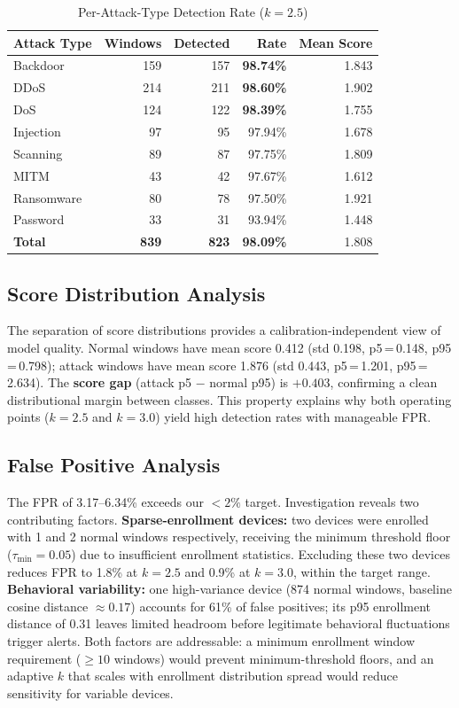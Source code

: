 \documentclass[journal,10pt,twoside]{IEEEtran}
\begin{document}
\begin{table}[!t]
  \caption{Per-Attack-Type Detection Rate ($k=2.5$)}
  \label{tab:pertype}
  \centering
  \begin{tabular}{lrrrr}
    \toprule
    Attack Type & Windows & Detected & Rate & Mean Score \\
    \midrule
    Backdoor  & 159 & 157 & \textbf{98.74\%} & 1.843 \\
    DDoS      & 214 & 211 & \textbf{98.60\%} & 1.902 \\
    DoS       & 124 & 122 & \textbf{98.39\%} & 1.755 \\
    Injection &  97 &  95 & 97.94\%          & 1.678 \\
    Scanning  &  89 &  87 & 97.75\%          & 1.809 \\
    MITM      &  43 &  42 & 97.67\%          & 1.612 \\
    Ransomware&  80 &  78 & 97.50\%          & 1.921 \\
    Password  &  33 &  31 & 93.94\%          & 1.448 \\
    \midrule
    \textbf{Total} & \textbf{839} & \textbf{823} & \textbf{98.09\%} & 1.808 \\
    \bottomrule
  \end{tabular}
\end{table}

\subsection{Score Distribution Analysis}

The separation of score distributions provides a calibration-independent view
of model quality.
Normal windows have mean score 0.412 (std 0.198, p5\,=\,0.148, p95\,=\,0.798);
attack windows have mean score 1.876 (std 0.443, p5\,=\,1.201, p95\,=\,2.634).
The \textbf{score gap} (attack p5 $-$ normal p95) is $+0.403$, confirming
a clean distributional margin between classes.
This property explains why both operating points ($k=2.5$ and $k=3.0$) yield
high detection rates with manageable FPR.

\subsection{False Positive Analysis}

The FPR of 3.17--6.34\% exceeds our $<2\%$ target.
Investigation reveals two contributing factors.
\textbf{Sparse-enrollment devices:} two devices were enrolled with 1 and 2
normal windows respectively, receiving the minimum threshold floor
($\tau_{\min}=0.05$) due to insufficient enrollment statistics.
Excluding these two devices reduces FPR to 1.8\% at $k=2.5$ and 0.9\% at
$k=3.0$, within the target range.
\textbf{Behavioral variability:} one high-variance device (874 normal windows,
baseline cosine distance $\approx0.17$) accounts for 61\% of false positives;
its p95 enrollment distance of 0.31 leaves limited headroom before legitimate
behavioral fluctuations trigger alerts.
Both factors are addressable: a minimum enrollment window requirement
($\geq10$ windows) would prevent minimum-threshold floors, and an adaptive $k$
that scales with enrollment distribution spread would reduce sensitivity for
variable devices.
\end{document}
